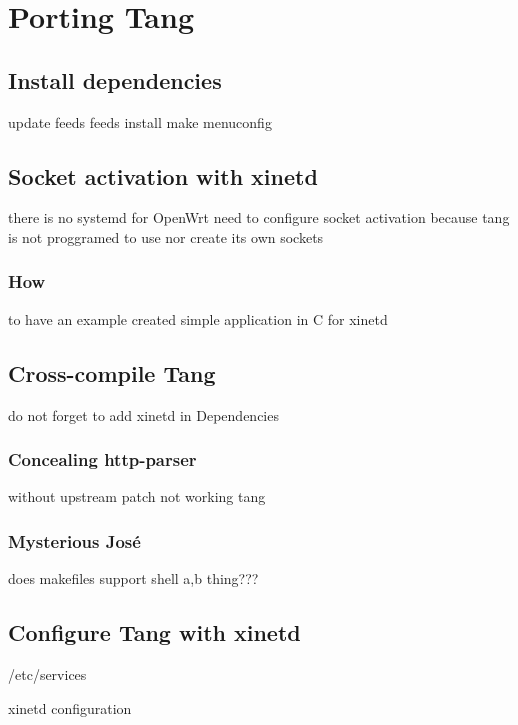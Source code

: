 \chapter{Porting Tang}\label{porting-tang}


\section{Install dependencies}

update feeds
feeds install
make menuconfig
\newpage

\section{Socket activation with xinetd}

there is no systemd for OpenWrt
need to configure socket activation because tang is not proggramed to use nor create its own sockets
\subsection{How }

to have an example created simple application in C for xinetd
\newpage

\section{Cross-compile Tang}

do not forget to add xinetd in Dependencies
\newpage

\subsection{Concealing http-parser}

without upstream patch not working tang
\newpage

\subsection{Mysterious José}

does makefiles support shell {a,b} thing???
\newpage

\section{Configure Tang with xinetd}

/etc/services

xinetd configuration

